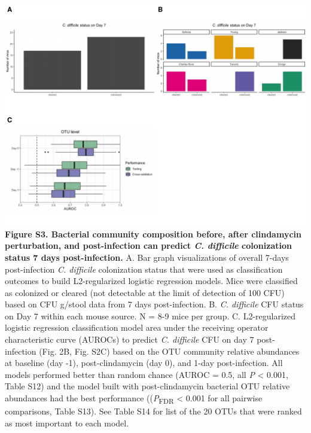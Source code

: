 \documentclass[
  11pt,
]{article}
\begin{document}
\includegraphics{figure_S3.pdf} \textbf{Figure S3. Bacterial community
composition before, after clindamycin perturbation, and post-infection
can predict \emph{C. difficile} colonization status 7 days
post-infection.} A. Bar graph visualizations of overall 7-days
post-infection \emph{C. difficile} colonization status that were used as
classification outcomes to build L2-regularized logistic regression
models. Mice were classified as colonized or cleared (not detectable at
the limit of detection of 100 CFU) based on CFU g/stool data from 7 days
post-infection. B. \emph{C. difficile} CFU status on Day 7 within each
mouse source. N = 8-9 mice per group. C. L2-regularized logistic
regression classification model area under the receiving operator
characteristic curve (AUROCs) to predict \emph{C. difficile} CFU on day
7 post-infection (Fig. 2B, Fig. S2C) based on the OTU community relative
abundances at baseline (day -1), post-clindamycin (day 0), and 1-day
post-infection. All models performed better than random chance (AUROC =
0.5, all \emph{P} \textless{} 0.001, Table S12) and the model built with
post-clindamycin bacterial OTU relative abundances had the best
performance ((\emph{P}\textsubscript{FDR} \textless{} 0.001 for all
pairwise comparisons, Table S13). See Table S14 for list of the 20 OTUs
that were ranked as most important to each model.

\newpage
\end{document}
